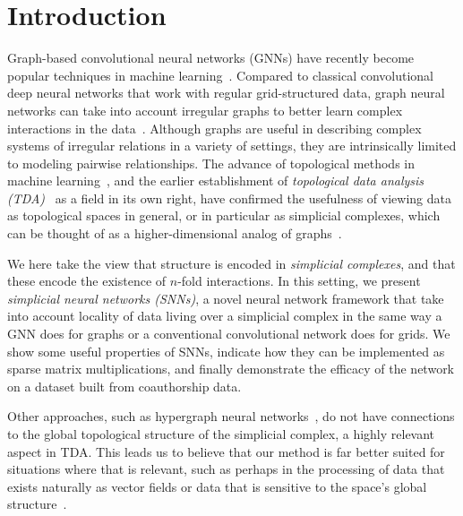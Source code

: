 \section{Introduction}

Graph-based convolutional neural networks (GNNs) have recently become popular techniques in machine learning~\cite{defferrard2016convolutional, bronstein2017geometric, wu2020survey}. Compared to classical convolutional deep neural networks that work with regular grid-structured data, graph neural networks can take into account irregular graphs to better learn complex interactions in the data~\cite{battaglia2018relational}. Although graphs are useful in describing complex systems of irregular relations in a variety of settings, they are intrinsically limited to modeling pairwise relationships. The advance of topological methods in machine learning~\cite{Gabrielsson2020topological, Hofer2019LearningRO, rieck2018neural}, and the earlier establishment of \emph{topological data analysis (TDA)}~\cite{carlsson2008,chazal2017,edelsbrunner2010computational,ghrist2008barcodes} as a field in its own right, have confirmed the usefulness of viewing data as topological spaces in general, or in particular as simplicial complexes, which can be thought of as a higher-dimensional analog of graphs~\cite{moore2012,patania2017}.

We here take the view that structure is encoded in \emph{simplicial complexes}, and that these encode the existence of $n$-fold interactions. In this setting, we present \emph{simplicial neural networks (SNNs)}, a novel neural network framework that take into account locality of data living over a simplicial complex in the same way a GNN does for graphs or a conventional convolutional network does for grids. We show some useful properties of SNNs, indicate how they can be implemented as sparse matrix multiplications, and finally demonstrate the efficacy of the network on a dataset built from coauthorship data.

Other approaches, such as hypergraph neural networks~\cite{feng2018hypergraphs}, do not have connections to the global topological structure of the simplicial complex, a highly relevant aspect in TDA. This leads us to believe that our method is far better suited for situations where that is relevant, such as perhaps in the processing of data that exists naturally as vector fields or data that is sensitive to the space's global structure~\cite{perraudin2019deepsphere}.

